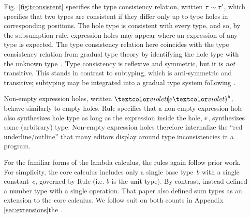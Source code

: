 

Fig.~\ref{fig:tconsistent} specifies the type consistency relation, written $\tau \sim \tau'$, which specifies that two types are consistent if they differ only up to type holes in corresponding positions.
%
The hole type is consistent with every type, and so, by the subsumption rule, expression holes may appear where an expression of any type is expected. The type consistency relation here coincides with the type consistency relation from gradual type theory by identifying the hole type with the unknown type~\cite{Siek06a}.
%
Type consistency is reflexive and symmetric, but it is \emph{not} transitive.
%
This stands in contrast to subtyping, which is anti-symmetric and transitive; subtyping may be integrated into a gradual type system following \citet{Siek:2007qy}.

Non-empty expression holes, written $\hhole{\hexp}{u}$, behave similarly to empty holes.
%
Rule  specifies that a non-empty expression hole also synthesizes hole type as long as the expression inside the hole, $e$, synthesizes some (arbitrary) type.
%
Non-empty expression holes therefore internalize the ``red underline/outline'' that many editors display around type inconsistencies in a program.

For the familiar forms of the lambda calculus, the rules again follow prior work.
%
For simplicity, the core calculus includes only a single base type~$b$ with a single constant~$c$, governed by Rule  (i.e. $b$ is the unit type).
%
By contrast, \citet{popl-paper} instead defined a number type with a single operation. That paper also defined sum types as an extension to the core calculus. We follow suit on both counts in \ifarxiv Appendix \ref{sec:extensions}\else the \appendixName\fi.%
%

